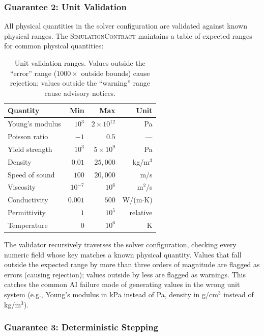 \documentclass[letterpaper,twocolumn,10pt]{article}
\newcommand{\simcontract}{\textsc{SimulationContract}}
\begin{document}
\subsubsection{Guarantee 2: Unit Validation}

All physical quantities in the solver configuration are validated
against known physical ranges. The \simcontract{} maintains a table
of expected ranges for common physical quantities:

\begin{table}[t]
\centering
\caption{Unit validation ranges. Values outside the ``error'' range
  ($1000\times$ outside bounds) cause rejection; values outside
  the ``warning'' range cause advisory notices.}
\label{tab:unitranges}
\small
\begin{tabular}{@{}lrrr@{}}
\toprule
\textbf{Quantity} & \textbf{Min} & \textbf{Max} & \textbf{Unit} \\
\midrule
Young's modulus     & $10^3$     & $2\times10^{12}$ & Pa \\
Poisson ratio       & $-1$       & $0.5$            & --- \\
Yield strength      & $10^3$     & $5\times10^9$    & Pa \\
Density             & $0.01$     & $25{,}000$       & kg/m$^3$ \\
Speed of sound      & $100$      & $20{,}000$       & m/s \\
Viscosity           & $10^{-7}$  & $10^6$           & m$^2$/s \\
Conductivity        & $0.001$    & $500$            & W/(m$\cdot$K) \\
Permittivity        & $1$        & $10^5$           & relative \\
Temperature         & $0$        & $10^6$           & K \\
\bottomrule
\end{tabular}
\end{table}

The validator recursively traverses the solver configuration, checking
every numeric field whose key matches a known physical quantity. Values
that fall outside the expected range by more than three orders of
magnitude are flagged as errors (causing rejection); values outside
by less are flagged as warnings. This catches the common AI failure
mode of generating values in the wrong unit system (e.g., Young's
modulus in kPa instead of Pa, density in g/cm$^3$ instead of kg/m$^3$).

\subsubsection{Guarantee 3: Deterministic Stepping}
\end{document}
